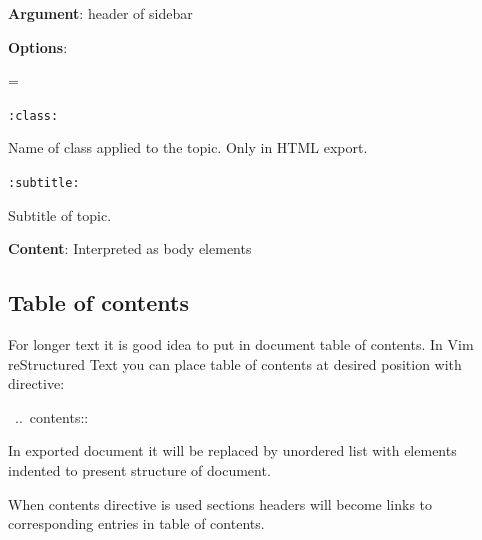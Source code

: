 \documentclass[12pt]{article}
\newenvironment{deflist}[1]{%
\begin{list}{}
{\renewcommand{\makelabel}[1]{\textbf{##1}\hfill}
\settowidth{\labelwidth}{\textbf{#1}}
\leftmargin=\labelwidth
\advance \leftmargin\labelsep}}
{\end{list}}
\begin{document}
\begin{itemize}
\item
\textbf{Argument}: header of sidebar

\item
\textbf{Options}:

 \begin{deflist}{iii}

\item[ \texttt{:class:}]

Name of class applied to the topic. Only in HTML export.

\item[ \texttt{:subtitle:}]

Subtitle of topic.
\end{deflist}

\item
\textbf{Content}: Interpreted as body elements
\end{itemize}
\hypertarget{ltable-of-contents}{}
\subsection{Table of contents}

For longer text it is good idea to put in document table of contents.
In Vim reStructured Text you can place table of contents at desired position with
directive:

\begin{ttfamily}\begin{flushleft}
\mbox{~..~contents::}\\
\end{flushleft}\end{ttfamily}

In exported document it will be replaced by unordered list with elements
indented to present structure of document.

When contents directive is used sections headers will become links to
corresponding entries in table of contents.
\end{document}
